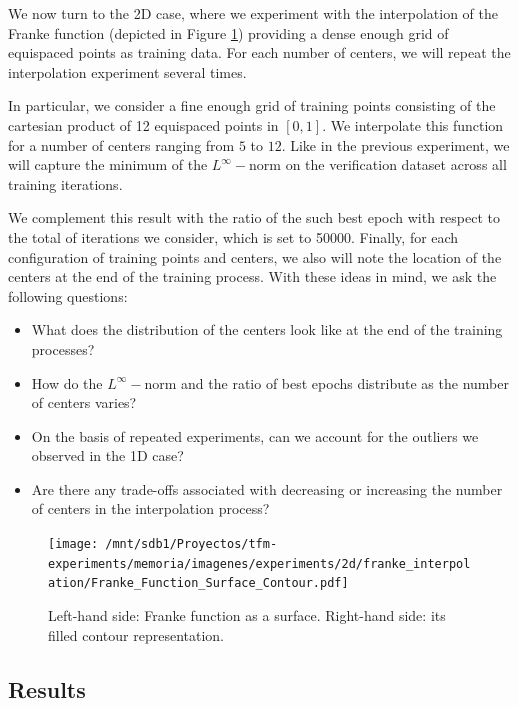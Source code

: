 \documentclass[12pt]{report} %
\begin{document}
We now turn to the 2D case, where we experiment with the interpolation of the 
Franke function (depicted in Figure \ref{fig:franke-function-surface-contour})
providing a dense enough grid of equispaced points as training data. 
For each number of centers, we will repeat the interpolation experiment
several times. 

In particular, we consider a fine enough grid of training points consisting of
the cartesian product of 12 equispaced points in $[0,1]$. We interpolate this
function for a number of centers ranging from $5$ to $12$. Like in the previous
experiment, we will capture the minimum of the $L^\infty-$norm on the 
verification dataset across all training iterations. 

We complement 
this result with the ratio of the such best epoch with respect to the 
total of iterations we consider, which is set to 50000. Finally, for each
configuration of training points and centers, we also will note the location 
of the centers at the end of the training process. With these ideas in mind,
we ask the following questions:

\begin{itemize}
  \item What does the distribution of the centers look like at the end of the 
  training processes? 
  \item How do the $L^\infty-$norm and the ratio of best epochs distribute 
  as the number of centers varies?
  \item On the basis of repeated experiments, can we account for the outliers 
  we observed in the 1D case?
  \item Are there any trade-offs associated with decreasing
  or increasing the number of centers in the interpolation process?
\end{itemize}

\begin{figure}[ht]
  \texttt{[image: /mnt/sdb1/Proyectos/tfm-experiments/memoria/imagenes/experiments/2d/franke\_interpolation/Franke\_Function\_Surface\_Contour.pdf]}
  \caption{Left-hand side: Franke function as a surface. Right-hand side:
  its filled contour representation.}
  \label{fig:franke-function-surface-contour}
\end{figure}


\subsection*{Results}
\end{document}
